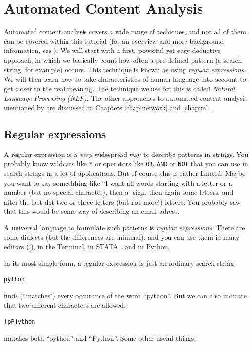 \documentclass[a4paper,12pt]{book}
\begin{document}
\chapter{Automated Content Analysis}
Automated content analysis covers a wide range of techiques, and not all of them can be covered within this tutorial (for an overview and more background information, see \cite{Boumans2016}). We will start with a first, powerful yet easy deductive approach, in which we basically count how often a pre-defined pattern (a search string, for example) occurs. This technique is known as using \emph{regular expressions}. We will then learn how to take characteristics of human language into account to get closer to the real meaning. The technique we use for this is called \emph{Natural Language Processing (NLP)}.
The other approaches to automated content analysis mentioned by \cite{Boumans2016} are discussed in Chapters \ref{chap:network} and \ref{chap:ml}.


\section{Regular expressions}

A regular expression is a \emph{very} widespread way to describe patterns in strings. You probably know wildcats like {\tt{*}} or operators like {\tt{OR}}, {\tt{AND}} or {\tt{NOT}} that you can use in search strings in a lot of applications. But of course this is rather limited: Maybe you want to say somethhing like ``I want all words starting with a letter or a number (but no special character), then a \@-sign, then again some letters, and after the last dot two or three letters (but not more!) letters. You probably saw that this would be some way of describing an email-adress. 

A universal language to formulate such patterns is \emph{regular expressions}. There are some dialects (but the differences are minimal), and you can use them in many editors (!), in the Terminal, in STATA \ldots and in Python.

In its most simple form, a regular expression is just an ordinary search string:
\begin{lstlisting}
python
\end{lstlisting}
finds (``matches") every occurance of the word ``python''. But we can also indicate that two different characters are allowed:
\begin{lstlisting}
[pP]ython
\end{lstlisting}
matches both ``python'' and ``Python''. Some other useful things:
\end{document}
